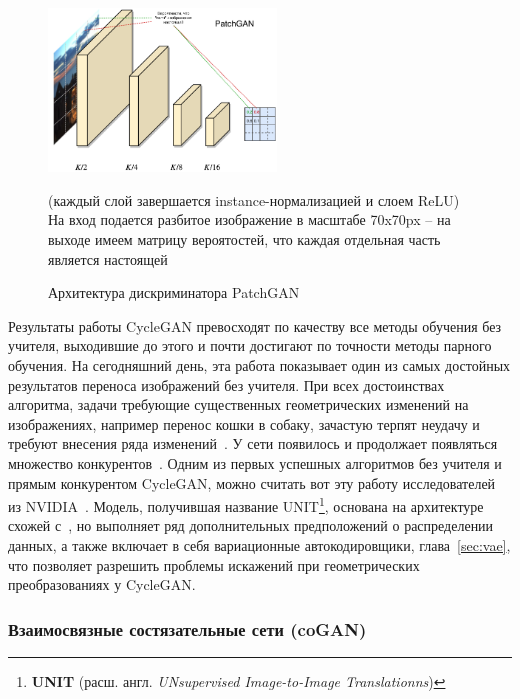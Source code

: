 \documentclass[11pt,a4paper]{extarticle}
\begin{document}
			\begin{figure}[ht]
				\centering
				\includegraphics[width=0.54\textwidth]{img/cyclegan_dis}
				\caption{Архитектура дискриминатора PatchGAN}{
					\small{
						(каждый слой завершается instance-нормализацией и слоем ReLU)\\
						На вход подается разбитое изображение в масштабе 70x70px -- на выходе имеем матрицу вероятостей, что каждая отдельная часть является настоящей
					}
				}
				\label{pic:cyclegan_dis}
			\end{figure}

			Результаты работы CycleGAN превосходят по качеству все методы обучения без учителя, выходившие до этого
			и почти достигают по точности методы парного обучения.
			На сегодняшний день, эта работа показывает один из самых достойных результатов переноса изображений без учителя.
			При всех достоинствах алгоритма, задачи требующие существенных геометрических изменений на изображениях, например перенос кошки в собаку, зачастую терпят неудачу и требуют внесения ряда изменений~\cite{CycleGAN}.
			\newline\newline
			У сети появилось и продолжает появляться множество конкурентов~\cite{BicycleGAN,MUNIT,UNIT,DRIT}.
			Одним из первых успешных алгоритмов без учителя и прямым конкурентом CycleGAN, можно считать вот эту работу исследователей из NVIDIA~\cite{UNIT}.
			Модель, получившая название UNIT\footnote{
				\textbf{UNIT} (расш. англ. \textit{UNsupervised Image-to-Image Translationns})
			}, основана на архитектуре схожей с~\cite{CycleGAN}, но выполняет ряд дополнительных предположений о распределении данных, а также включает в себя
			вариационные автокодировщики, глава~\ref{sec:vae}, что позволяет разрешить проблемы искажений при геометрических преобразованиях у CycleGAN.
		
		\subsubsection*{Взаимосвязные состязательные сети (coGAN)}\label{sec:cogan}
\end{document}
